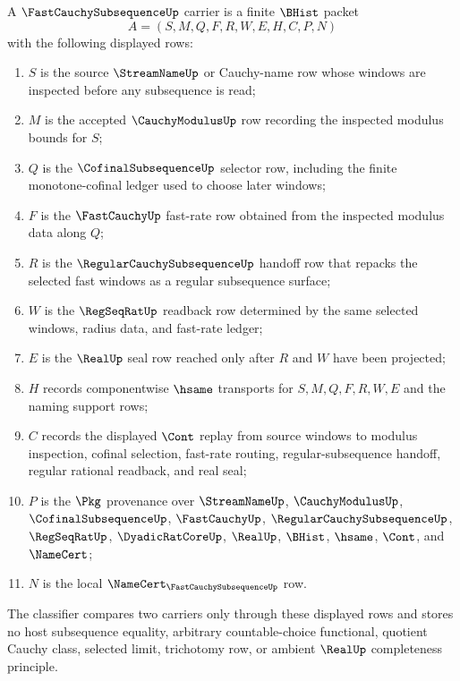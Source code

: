 \begin{definition}
\label{def:fast-cauchy-subsequence-carrier}
A $\FastCauchySubsequenceUp$ carrier is a finite $\BHist$ packet
$$
A=(S,M,Q,F,R,W,E,H,C,P,N)
$$
with the following displayed rows:
\begin{enumerate}
\item $S$ is the source $\StreamNameUp$ or Cauchy-name row whose windows are inspected before any subsequence is read;
\item $M$ is the accepted $\CauchyModulusUp$ row recording the inspected modulus bounds for $S$;
\item $Q$ is the $\CofinalSubsequenceUp$ selector row, including the finite monotone-cofinal ledger used to choose later windows;
\item $F$ is the $\FastCauchyUp$ fast-rate row obtained from the inspected modulus data along $Q$;
\item $R$ is the $\RegularCauchySubsequenceUp$ handoff row that repacks the selected fast windows as a regular subsequence surface;
\item $W$ is the $\RegSeqRatUp$ readback row determined by the same selected windows, radius data, and fast-rate ledger;
\item $E$ is the $\RealUp$ seal row reached only after $R$ and $W$ have been projected;
\item $H$ records componentwise $\hsame$ transports for $S,M,Q,F,R,W,E$ and the naming support rows;
\item $C$ records the displayed $\Cont$ replay from source windows to modulus inspection, cofinal selection, fast-rate routing, regular-subsequence handoff, regular rational readback, and real seal;
\item $P$ is the $\Pkg$ provenance over $\StreamNameUp$, $\CauchyModulusUp$, $\CofinalSubsequenceUp$, $\FastCauchyUp$, $\RegularCauchySubsequenceUp$, $\RegSeqRatUp$, $\DyadicRatCoreUp$, $\RealUp$, $\BHist$, $\hsame$, $\Cont$, and $\NameCert$;
\item $N$ is the local $\NameCert_{\FastCauchySubsequenceUp}$ row.
\end{enumerate}
The classifier compares two carriers only through these displayed rows and stores no host subsequence equality, arbitrary countable-choice functional, quotient Cauchy class, selected limit, trichotomy row, or ambient $\RealUp$ completeness principle.
\end{definition}

